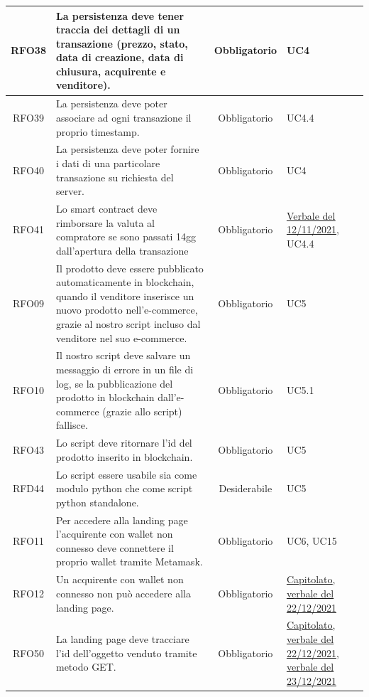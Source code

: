 \documentclass[a4paper, 12pt]{article}
\begin{document}
\begin{longtable}{|c|p{7cm}|c|p{4cm}|}
\hline
RFO38 & La persistenza deve tener traccia dei dettagli di un transazione (prezzo, stato, data di creazione, data di chiusura, acquirente e venditore). & Obbligatorio & UC4 \\
\hline
RFO39 & La persistenza deve poter associare ad ogni transazione il proprio timestamp. & Obbligatorio & UC4.4 \\
\hline
RFO40 & La persistenza deve poter fornire i dati di una particolare transazione su richiesta del server. & Obbligatorio & UC4 \\
\hline
RFO41 & Lo smart contract deve rimborsare la valuta al compratore se sono passati 14gg dall'apertura della transazione & Obbligatorio & \underline{\href{https://github.com/iota97/WinningSoftwareSolution/blob/main/public/interni/verbali/2021_11_12_I.pdf}{Verbale del 12/11/2021}}, UC4.4 \\
\hline
RFO09 & Il prodotto deve essere pubblicato automaticamente in blockchain, quando il venditore inserisce un nuovo prodotto nell'e-commerce, grazie al nostro script incluso dal venditore nel suo e-commerce. & Obbligatorio & UC5 \\
\hline
RFO10 & Il nostro script deve salvare un messaggio di errore in un file di log, se la pubblicazione del prodotto in blockchain dall'e-commerce (grazie allo script) fallisce. & Obbligatorio & UC5.1 \\
\hline
RFO43 & Lo script deve ritornare l'id del prodotto inserito in blockchain. & Obbligatorio & UC5 \\
\hline
RFD44 & Lo script essere usabile sia come modulo python che come script python standalone. & Desiderabile & UC5 \\
\hline
RFO11 & Per accedere alla landing page l'acquirente con wallet non connesso deve connettere il proprio wallet tramite Metamask. & Obbligatorio & UC6, UC15 \\
\hline
RFO12 & Un acquirente con wallet non connesso non può accedere alla landing page. & Obbligatorio & \underline{\href{https://www.math.unipd.it/~tullio/IS-1/2021/Progetto/C2.pdf}{Capitolato}}, \underline{\href{https://github.com/iota97/WinningSoftwareSolution/blob/main/public/esterni/verbali/2021_12_22_E.pdf}{verbale del 22/12/2021}} \\
\hline
RFO50 & La landing page deve tracciare l'id dell'oggetto venduto tramite metodo GET. & Obbligatorio & \underline{\href{https://www.math.unipd.it/~tullio/IS-1/2021/Progetto/C2.pdf}{Capitolato}}, \underline{\href{https://github.com/iota97/WinningSoftwareSolution/blob/main/public/esterni/verbali/2021_12_22_E.pdf}{verbale del 22/12/2021}}, \underline{\href{https://github.com/iota97/WinningSoftwareSolution/blob/main/public/interni/verbali/2021_12_23_I.pdf}{verbale del 23/12/2021}} \\

\end{longtable}
\end{document}
